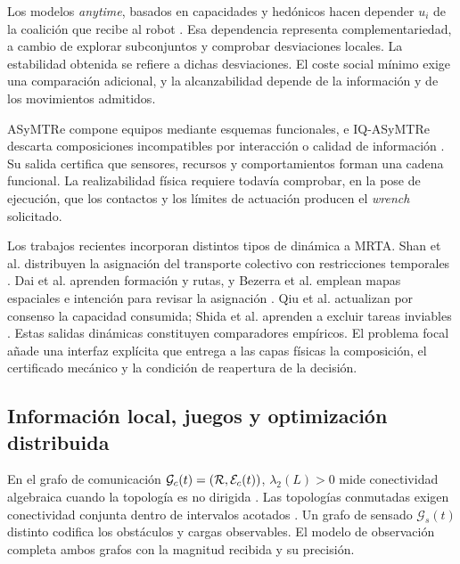 Los modelos \emph{anytime}, basados en capacidades y hedónicos hacen depender \(u_i\) de la coalición que recibe al robot \parencite{shehoryKraus1998Coalition,vigAdams2006Coalition,dutta2021hedonic}. Esa dependencia representa complementariedad, a cambio de explorar subconjuntos y comprobar desviaciones locales. La estabilidad obtenida se refiere a dichas desviaciones. El coste social mínimo exige una comparación adicional, y la alcanzabilidad depende de la información y de los movimientos admitidos.

ASyMTRe compone equipos mediante esquemas funcionales, e IQ-ASyMTRe descarta composiciones incompatibles por interacción o calidad de información \parencite{parkerTang2006ASyMTRe,zhangParker2013IQASyMTRe}. Su salida certifica que sensores, recursos y comportamientos forman una cadena funcional. La realizabilidad física requiere todavía comprobar, en la pose de ejecución, que los contactos y los límites de actuación producen el \emph{wrench} solicitado.

Los trabajos recientes incorporan distintos tipos de dinámica a MRTA. Shan et al.
distribuyen la asignación del transporte colectivo con restricciones temporales
\parencite{shan2024collectiveTransport}. Dai et al. aprenden formación y rutas, y
Bezerra et al. emplean mapas espaciales e intención para revisar la asignación
\parencite{dai2024dynamicCoalition,bezerra2025dynamicCoalition}. Qiu et al.
actualizan por consenso la capacidad consumida; Shida et al. aprenden a excluir
tareas inviables \parencite{qiu2024payloadConsumption,shida2025infeasibleTasks}.
Estas salidas dinámicas constituyen comparadores empíricos. El problema focal añade una interfaz explícita que entrega a las capas físicas la composición, el certificado mecánico y la condición de reapertura de la decisión.

\subsection{Información local, juegos y optimización distribuida}
\label{subsec:tf-games-consensus}

En el grafo de comunicación \(\mathcal G_c(t)=(\mathcal{R},\mathcal E_c(t))\), \(\lambda_2(L)>0\) mide conectividad algebraica cuando la topología es no dirigida \parencite{bullo2009distributed}. Las topologías conmutadas exigen conectividad conjunta dentro de intervalos acotados \parencite{olfatiSaber2004switchingConsensus}. Un grafo de sensado \(\mathcal G_s(t)\) distinto codifica los obstáculos y cargas observables. El modelo de observación completa ambos grafos con la magnitud recibida y su precisión.

